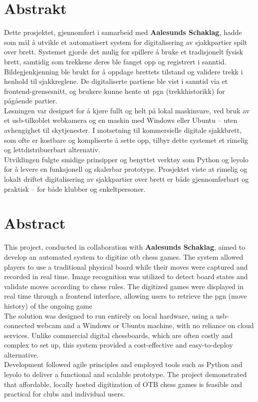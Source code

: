 \chapter*{Abstrakt}

Dette prosjektet, gjennomført i samarbeid med \textbf{Aalesunds Schaklag}, hadde som mål å utvikle et automatisert system for digitalisering av sjakkpartier spilt over brett. Systemet gjorde det mulig for spillere å bruke et tradisjonelt fysisk brett, samtidig som trekkene deres ble fanget opp og registrert i sanntid. Bildegjenkjenning ble brukt for å oppdage brettets tilstand og validere trekk i henhold til sjakkreglene. De digitaliserte partiene ble vist i sanntid via et frontend-grensesnitt, og brukere kunne hente ut \acrshort{pgn} (trekkhistorikk) for pågående partier. \\

Løsningen var designet for å kjøre fullt og helt på lokal maskinvare, ved bruk av et \acrshort{usb}-tilkoblet webkamera og en maskin med Windows eller Ubuntu – uten avhengighet til skytjenester. I motsetning til kommersielle digitale sjakkbrett, som ofte er kostbare og kompliserte å sette opp, tilbyr dette systemet et rimelig og lettdistribuerbart alternativ. \\

Utviklingen fulgte smidige prinsipper og benyttet verktøy som Python og \acrshort{leyolo} for å levere en funksjonell og skalerbar prototype. Prosjektet viste at rimelig og lokalt driftet digitalisering av sjakkpartier over brett er både gjennomførbart og praktisk – for både klubber og enkeltpersoner.

\newpage


\chapter*{Abstract}
This project, conducted in collaboration with \textbf{Aalesunds Schaklag}, aimed to develop an automated system to digitize \gls{otb} chess games. The system allowed players to use a traditional physical board while their moves were captured and recorded in real time. Image recognition was utilized to detect board states and validate moves according to chess rules. The digitized games were displayed in real time through a frontend interface, allowing users to retrieve the \acrshort{pgn} (move history) of the ongoing game \\

The solution was designed to run entirely on local hardware, using a \acrshort{usb}-connected webcam and a Windows or Ubuntu machine, with no reliance on cloud services. Unlike commercial digital chessboards, which are often costly and complex to set up, this system provided a cost-effective and easy-to-deploy alternative. \\

Development followed agile principles and employed tools such as Python and \acrshort{leyolo} to deliver a functional and scalable prototype. The project demonstrated that affordable, locally hosted digitization of OTB chess games is feasible and practical for clubs and individual users.